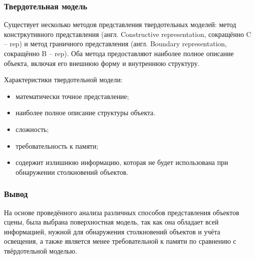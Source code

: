 
\subsubsection{Твердотельная модель}

Существует несколько методов представления твердотельных моделей: метод констркутивного представления (англ. Constructive representation, сокращённо C -- rep) и метод граничного представления (англ. Boundary representation, сокращённо B -- rep). %
Оба метода предоставляют наиболее полное описание объекта, включая его внешнюю форму и внутреннюю структуру.

Характеристики твердотельной модели:
\begin{itemize}
    \item математически точное представление;
    \item наиболее полное описание структуры объекта.
    \item сложность;
    \item требовательность к памяти;
    \item содержит излишнюю информацию, которая не будет использована при обнаружении столкновений объектов.
\end{itemize}


\subsubsection*{Вывод}

На основе проведённого анализа различных способов представления объектов сцены, была выбрана поверхностная модель, так как она обладает всей информацией, нужной для обнаружения столкновений объектов и учёта освещения, а также является менее требовательной к памяти по сравнению с твёрдотельной моделью.

